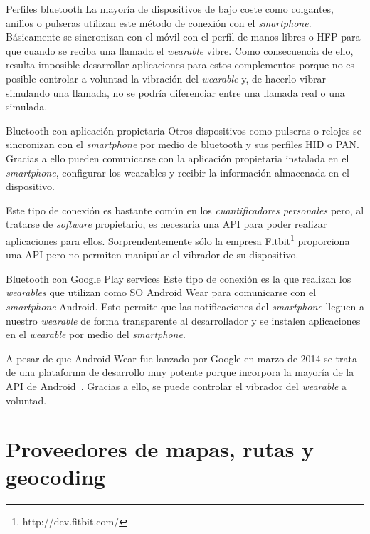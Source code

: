 \begin{definitionlist}
  \item[Perfiles bluetooth] La mayoría de dispositivos de bajo coste como colgantes, anillos o
    pulseras utilizan este método de conexión con el \emph{smartphone}. Básicamente se sincronizan
    con el móvil con el perfil de manos libres o \acf{HFP} para que cuando se reciba una
    llamada el \emph{wearable} vibre. Como consecuencia de ello, resulta imposible desarrollar
    aplicaciones para estos complementos porque no es posible controlar a voluntad la vibración del
    \emph{wearable} y, de hacerlo vibrar simulando una llamada, no se podría diferenciar entre una
    llamada real o una simulada.

  \item[Bluetooth con aplicación propietaria] Otros dispositivos como pulseras o relojes se
    sincronizan con el \emph{smartphone} por medio de bluetooth y sus perfiles \acf{HID} o
    \acf{PAN}. Gracias a ello pueden comunicarse con la aplicación propietaria instalada en el
    \emph{smartphone}, configurar los wearables y recibir la información almacenada en el
    dispositivo.

    Este tipo de conexión es bastante común en los \emph{cuantificadores personales} pero, al
    tratarse de \emph{software} propietario, es necesaria una \acs{API} para poder realizar
    aplicaciones para ellos. Sorprendentemente sólo la empresa
    Fitbit\footnote{http://dev.fitbit.com/} proporciona una \acs{API} pero no permiten manipular el
    vibrador de su dispositivo.

  \item[Bluetooth con Google Play services] Este tipo de conexión es la que realizan los
    \emph{wearables} que utilizan como \acs{SO} Android Wear para comunicarse con el
    \emph{smartphone} Android. Esto permite que las notificaciones del \emph{smartphone} lleguen a
    nuestro \emph{wearable} de forma transparente al desarrollador y se instalen aplicaciones en el
    \emph{wearable} por medio del \emph{smartphone}.

    A pesar de que Android Wear fue lanzado por Google en marzo de 2014 se trata de una plataforma
    de desarrollo muy potente porque incorpora la mayoría de la \acs{API} de
    Android~\cite{APIAW}. Gracias a ello, se puede controlar el vibrador del \emph{wearable} a
    voluntad.
 
\end{definitionlist}

\section{Proveedores de mapas, rutas y geocoding}
\label{sec:proveedores}

